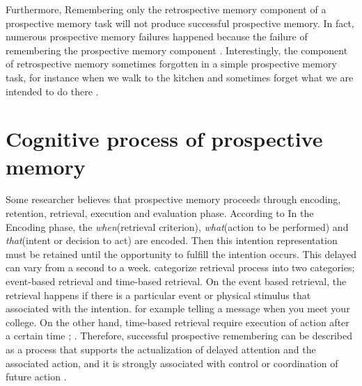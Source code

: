 Furthermore, Remembering only the retrospective memory component of a prospective memory task will not produce successful prospective memory. In fact, numerous prospective memory failures happened because the failure of remembering the prospective memory component
\citep{einsteindGuynn1992}. Interestingly, the component of retrospective memory sometimes forgotten in a simple prospective memory task, for instance when we walk to the kitchen and sometimes forget what we are intended to do there \citep{brandimonte1996prospective}.


\section{Cognitive process of prospective memory}


Some researcher believes that prospective memory proceeds  through encoding, retention, retrieval, execution and evaluation phase.
According to \cite{inside1996prospective} In the Encoding phase, the \textit{when}(retrieval criterion), \textit{what}(action to be performed) and \textit{that}(intent or decision to act) are encoded. Then this intention representation must be retained until the opportunity to fulfill the intention occurs. This delayed can vary from a second to a week. \cite{EinsteinGillesO.1990NAaP} categorize  retrieval process into two categories;
event-based retrieval and time-based retrieval. On the event based retrieval, the retrieval happens if there is a particular event or physical stimulus that associated with the intention. for example telling a message when you meet your college. On the other hand,
time-based retrieval require execution of action after a certain time  \citep{inside1996prospective};   \citep{Mcgann2002}.
Therefore, successful prospective remembering can be described as a process that supports the actualization of
delayed attention and the associated action,
 and it is strongly associated with control or coordination of future action \citep{inside1996prospective}.

